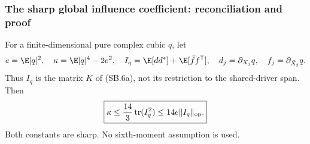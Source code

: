 \subsubsection{The sharp global influence coefficient: reconciliation and proof}
\label{sec:sharp-influence-audit}
\begin{theorem}\label{thm:sharp-influence-audit}
For a finite-dimensional pure complex cubic $q$, let
\[
 e=\E|q|^2,\quad \kappa=\E|q|^4-2e^2,\quad
 I_q=\E[dd^*]+\E[\bar f f^{\mathsf T}],\quad
 d_j=\partial_{X_j}q,\quad f_j=\partial_{\bar X_j}q.
\]
Thus $I_q$ is the matrix $K$ of (SB.6a), not its restriction to the
shared-driver span. Then
\[
 \boxed{\kappa\le\frac{14}{3}\operatorname{tr}(I_q^2)
                 \le14e\|I_q\|_{\rm op}.}
\]
Both constants are sharp. No sixth-moment assumption is used.
\end{theorem}
